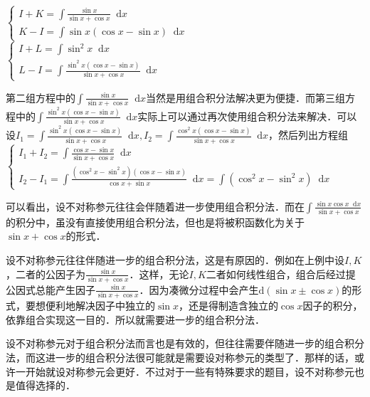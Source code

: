 \documentclass{ctexbook}
\newcommand*{\dif}{\mathop{}\!\mathrm{d}}
\begin{document}
$\begin{cases}I+K=\int\frac{\sin{x}}{\sin{x}+\cos{x}}\dif{x}\\K-I=\int\sin{x}\left(\cos{x}-\sin{x}\right)\dif{x}\end{cases}$\\
$\begin{cases}I+L=\int\sin^{2}{x}\dif{x}\\L-I=\int\frac{\sin^{2}{x}\left(\cos{x}-\sin{x}\right)}{\sin{x}+\cos{x}}\dif{x}\end{cases}$\par
第二组方程中的$\int\frac{\sin{x}}{\sin{x}+\cos{x}}\dif{x}$当然是用组合积分法解决更为便捷．而第三组方程中的$\int\frac{\sin^{2}{x}\left(\cos{x}-\sin{x}\right)}{\sin{x}+\cos{x}}\dif{x}$实际上可以通过再次使用组合积分法来解决．可以设$I_{1}=\int\frac{\sin^{2}{x}\left(\cos{x}-\sin{x}\right)}{\sin{x}+\cos{x}}\dif{x},I_{2}=\int\frac{\cos^{2}{x}\left(\cos{x}-\sin{x}\right)}{\sin{x}+\cos{x}}\dif{x}$，然后列出方程组\\
$\begin{cases}I_{1}+I_{2}=\int\frac{\cos{x}-\sin{x}}{\sin{x}+\cos{x}}\dif{x}\\I_{2}-I_{1}=\int\frac{\left(\cos^{2}{x}-\sin^{2}{x}\right)\left(\cos{x}-\sin{x}\right)}{\cos{x}+\sin{x}}\dif{x}=\int\left(\cos^{2}{x}-\sin^{2}{x}\right)\dif{x}\end{cases}$\par
可以看出，设不对称参元往往会伴随着进一步使用组合积分法．而在$\int\frac{\sin{x}\cos{x}\dif{x}}{\sin{x}+\cos{x}}$的积分中，虽没有直接使用组合积分法，但也是将被积函数化为关于$\sin{x}+\cos{x}$的形式．\par
设不对称参元往往伴随进一步的组合积分法，这是有原因的．例如在上例中设$I,K$，二者的公因子为$\frac{\sin{x}}{\sin{x}+\cos{x}}$．这样，无论$I,K$二者如何线性组合，组合后经过提公因式总能产生因子$\frac{\sin{x}}{\sin{x}+\cos{x}}$．因为凑微分过程中会产生$\mathrm{d}\left(\sin{x}\pm\cos{x}\right)$的形式，要想便利地解决因子中独立的$\sin{x}$，还是得制造含独立的$\cos{x}$因子的积分，依靠组合实现这一目的．所以就需要进一步的组合积分法．\par
设不对称参元对于组合积分法而言也是有效的，但往往需要伴随进一步的组合积分法，而这进一步的组合积分法很可能就是需要设对称参元的类型了．那样的话，或许一开始就设对称参元会更好．不过对于一些有特殊要求的题目，设不对称参元也是值得选择的．\par
\end{document}
